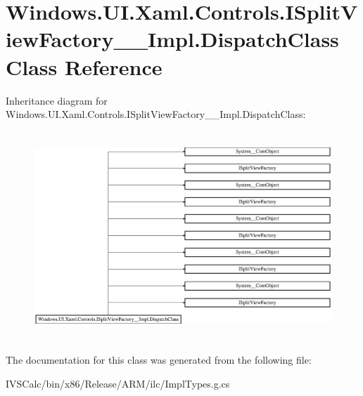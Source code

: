 \hypertarget{class_windows_1_1_u_i_1_1_xaml_1_1_controls_1_1_i_split_view_factory_____impl_1_1_dispatch_class}{}\section{Windows.\+U\+I.\+Xaml.\+Controls.\+I\+Split\+View\+Factory\+\_\+\+\_\+\+Impl.\+Dispatch\+Class Class Reference}
\label{class_windows_1_1_u_i_1_1_xaml_1_1_controls_1_1_i_split_view_factory_____impl_1_1_dispatch_class}
Inheritance diagram for Windows.\+U\+I.\+Xaml.\+Controls.\+I\+Split\+View\+Factory\+\_\+\+\_\+\+Impl.\+Dispatch\+Class\+:\begin{figure}[H]
\begin{center}
\leavevmode
\includegraphics[height=7.877238cm]{class_windows_1_1_u_i_1_1_xaml_1_1_controls_1_1_i_split_view_factory_____impl_1_1_dispatch_class}
\end{center}
\end{figure}


The documentation for this class was generated from the following file\+:\begin{DoxyCompactItemize}
\item 
I\+V\+S\+Calc/bin/x86/\+Release/\+A\+R\+M/ilc/Impl\+Types.\+g.\+cs\end{DoxyCompactItemize}
